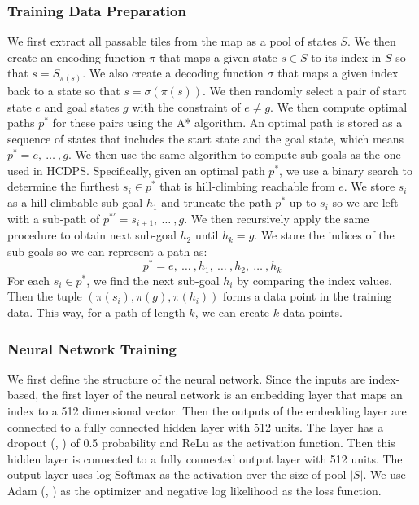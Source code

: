 \documentclass[letterpaper]{article}
\newcommand{\citea}[1]{(\citeauthor{#1}, \citeyear{#1})}
\numberwithin{equation}{section}
\numberwithin{theorem}{section}
\numberwithin{lemma}{section}
\numberwithin{df}{section}
\begin{document}
    \subsubsection{Training Data Preparation}

    We first extract all passable tiles from the map as a pool of states $S$.
    We then create an encoding function $\pi$ that maps a given state $s \in S $ to its index in $S$ so that $s = S_{\pi(s)}$.
    We also create a decoding function $\sigma$ that maps a given index back to a state so that $s = \sigma(\pi(s))$.
    We then randomly select a pair of start state $e$ and goal states $g$ with the constraint of $e \neq g$.
    We then compute optimal paths $p^*$ for these pairs using the A* algorithm.
    An optimal path is stored as a sequence of states that includes the start state and the goal state, which means $p^* = e, ~ \dots ~, g$.
    We then use the same algorithm to compute sub-goals as the one used in HCDPS.
    Specifically, given an optimal path $p^*$, we use a binary search to determine the furthest $s_i \in p^*$ that is hill-climbing reachable from $e$.
    We store $s_i$ as a hill-climbable sub-goal $h_1$ and truncate the path $p^*$ up to $s_i$ so we are left with a sub-path of $p^{*'} = s_{i+1}, ~ \dots ~, g$.
    We then recursively apply the same procedure to obtain next sub-goal $h_{2}$ until $h_k = g$.
    We store the indices of the sub-goals so we can represent a path as:
    \[ p^* = e, ~ \dots ~, h_1, ~ \dots ~, h_2, ~ \dots ~, h_k \]
    For each $s_i \in p^*$, we find the next sub-goal $h_i$ by comparing the index values.
    Then the tuple $\left( \pi(s_i), \pi(g), \pi(h_i) \right)$ forms a data point in the training data.
    This way, for a path of length $k$, we can create $k$ data points.

    \subsubsection{Neural Network Training}

    We first define the structure of the neural network.
    Since the inputs are index-based, the first layer of the neural network is an embedding layer that maps an index to a 512 dimensional vector.
    Then the outputs of the embedding layer are connected to a fully connected hidden layer with 512 units.
    The layer has a dropout \citea{dropout} of 0.5 probability and ReLu as the activation function.
    Then this hidden layer is connected to a fully connected output layer with 512 units.
    The output layer uses log Softmax as the activation over the size of pool $|S|$.
    We use Adam \citea{adam} as the optimizer and negative log likelihood as the loss function.
\end{document}
